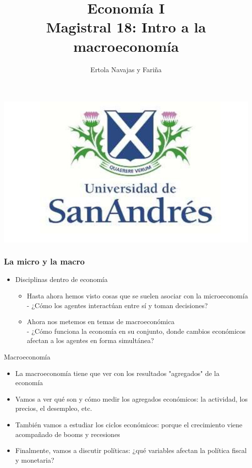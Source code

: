 \documentclass{beamer}
\title[Economía I]{Economía I \vspace{4mm}
\\ Magistral 18: Intro a la macroeconomía }
\date{}
\author[Ertola Navajas y Fariña]{Ertola Navajas y Fariña}
\institute[]{Universidad de San Andrés}
\begin{document}
\begin{frame}
\titlepage
\centering

\includegraphics[scale=0.2]{Slides Principios de Economia/Figures/logoUDESA.jpg} 
\end{frame}



\begin{frame}
\frametitle{La micro y la macro}
\begin{itemize}
        \item Disciplinas dentro de economía
        \vspace{2mm}
        \begin{itemize}
        \item Hasta ahora hemos visto cosas que se suelen asociar con la microeconomía \\
        - ¿Cómo los agentes interactúan entre sí y toman decisiones?
        \vspace{2mm}
        \item Ahora nos metemos en temas de macroeconómica \\
        - ¿Cómo funciona la economía en su conjunto, donde cambios económicos afectan a los agentes en forma simultánea?
        \end{itemize}
\end{itemize}
\end{frame}


\begin{frame}{Macroeconomía}
   \begin{itemize}
       \item La macroeconomía tiene que ver con los resultados "agregados" de la economía \vspace{1mm}
       \item Vamos a ver qué son y cómo medir los agregados económicos: la actividad, los precios, el desempleo, etc. \vspace{1mm}
       \item También vamos a estudiar los ciclos económicos: porque el crecimiento viene acompañado de booms y recesiones \vspace{1mm}
       \item Finalmente, vamos a discutir políticas: ¿qué variables afectan la política fiscal y monetaria? 
   \end{itemize} 
\end{frame}
\end{document}
